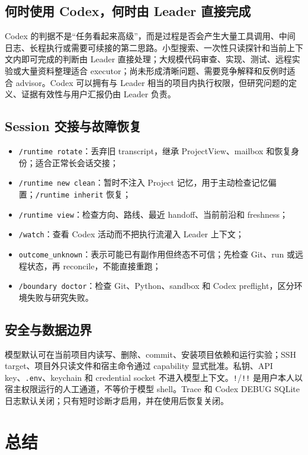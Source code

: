 \documentclass[UTF8,11pt,a4paper,fontset=fandol]{ctexart}
\newcommand{\code}[1]{\texttt{#1}}
\begin{document}
\subsection{何时使用 Codex，何时由 Leader 直接完成}

Codex 的判据不是“任务看起来高级”，而是过程是否会产生大量工具调用、中间日志、长程执行或需要可续接的第二思路。小型搜索、一次性只读探针和当前上下文内即可完成的判断由 Leader 直接处理；大规模代码审查、实现、测试、远程实验或大量资料整理适合 executor；尚未形成清晰问题、需要竞争解释和反例时适合 advisor。Codex 可以拥有与 Leader 相当的项目内执行权限，但研究问题的定义、证据有效性与用户汇报仍由 Leader 负责。

\subsection{Session 交接与故障恢复}

\begin{itemize}
  \item \code{/runtime rotate}：丢弃旧 transcript，继承 ProjectView、mailbox 和恢复身份；适合正常长会话交接；
  \item \code{/runtime new clean}：暂时不注入 Project 记忆，用于主动检查记忆偏置；\code{/runtime inherit} 恢复；
  \item \code{/runtime view}：检查方向、路线、最近 handoff、当前前沿和 freshness；
  \item \code{/watch}：查看 Codex 活动而不把执行流灌入 Leader 上下文；
  \item \code{outcome\_unknown}：表示可能已有副作用但终态不可信；先检查 Git、run 或远程状态，再 reconcile，不能直接重跑；
  \item \code{/boundary doctor}：检查 Git、Python、sandbox 和 Codex preflight，区分环境失败与研究失败。
\end{itemize}

\subsection{安全与数据边界}

模型默认可在当前项目内读写、删除、commit、安装项目依赖和运行实验；SSH target、项目外只读文件和宿主命令通过 capability 显式批准。私钥、API key、\code{.env}、keychain 和 credential socket 不进入模型上下文。\code{!}/\code{!!} 是用户本人以宿主权限运行的人工通道，不等价于模型 shell。Trace 和 Codex DEBUG SQLite 日志默认关闭；只有短时诊断才启用，并在使用后恢复关闭。

\clearpage
\section*{总结}
\end{document}

